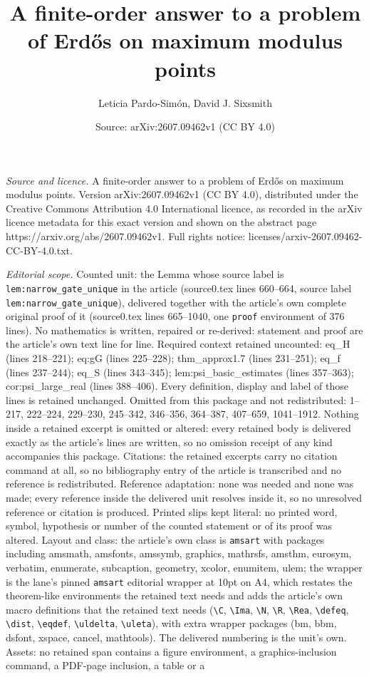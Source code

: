 \documentclass[10pt,a4paper]{amsart}
\title[A finite-order answer to a problem of Erd\H{o}s on maximum m]{A finite-order answer to a problem of Erd\H{o}s on maximum modulus points}
\author{Leticia Pardo-Sim\'on, David J. Sixsmith}
\date{Source: arXiv:2607.09462v1 (CC BY 4.0)}
\begin{document}
\maketitle

\noindent\emph{Source and licence.} A finite-order answer to a problem of Erd\H{o}s on maximum modulus points. Version arXiv:2607.09462v1 (CC BY 4.0), distributed under the Creative Commons Attribution 4.0 International licence, as recorded in the arXiv licence metadata for this exact version and shown on the abstract page https://arxiv.org/abs/2607.09462v1. Full rights notice: licenses/arxiv-2607.09462-CC-BY-4.0.txt.\par\smallskip

\noindent\textit{Editorial scope.} Counted unit: the Lemma whose source label is \texttt{lem:narrow\_gate\_unique} in the article (source0.tex lines 660--664, source label \texttt{lem:narrow\_gate\_unique}), delivered together with the article's own complete original proof of it (source0.tex lines 665--1040, one \texttt{proof} environment of 376 lines). No mathematics is written, repaired or re-derived: statement and proof are the article's own text line for line. Required context retained uncounted: eq\_H (lines 218--221); eq:gG (lines 225--228); thm\_approx1.7 (lines 231--251); eq\_f (lines 237--244); eq\_S (lines 343--345); lem:psi\_basic\_estimates (lines 357--363); cor:psi\_large\_real (lines 388--406). Every definition, display and label of those lines is retained unchanged. Omitted from this package and not redistributed: 1--217, 222--224, 229--230, 245--342, 346--356, 364--387, 407--659, 1041--1912. Nothing inside a retained excerpt is omitted or altered: every retained body is delivered exactly as the article's lines are written, so no omission receipt of any kind accompanies this package. Citations: the retained excerpts carry no citation command at all, so no bibliography entry of the article is transcribed and no reference is redistributed. Reference adaptation: none was needed and none was made; every reference inside the delivered unit resolves inside it, so no unresolved reference or citation is produced. Printed slips kept literal: no printed word, symbol, hypothesis or number of the counted statement or of its proof was altered. Layout and class: the article's own class is \texttt{amsart} with packages including amsmath, amsfonts, amssymb, graphics, mathrsfs, amsthm, eurosym, verbatim, enumerate, subcaption, geometry, xcolor, enumitem, ulem; the wrapper is the lane's pinned \texttt{amsart} editorial wrapper at 10pt on A4, which restates the theorem-like environments the retained text needs and adds the article's own macro definitions that the retained text needs (\texttt{\textbackslash C}, \texttt{\textbackslash Ima}, \texttt{\textbackslash N}, \texttt{\textbackslash R}, \texttt{\textbackslash Rea}, \texttt{\textbackslash defeq}, \texttt{\textbackslash dist}, \texttt{\textbackslash eqdef}, \texttt{\textbackslash uldelta}, \texttt{\textbackslash uleta}), with extra wrapper packages (bm, bbm, dsfont, xspace, cancel, mathtools). The delivered numbering is the unit's own. Assets: no retained span contains a figure environment, a graphics-inclusion command, a PDF-page inclusion, a table or a 
\end{document}
